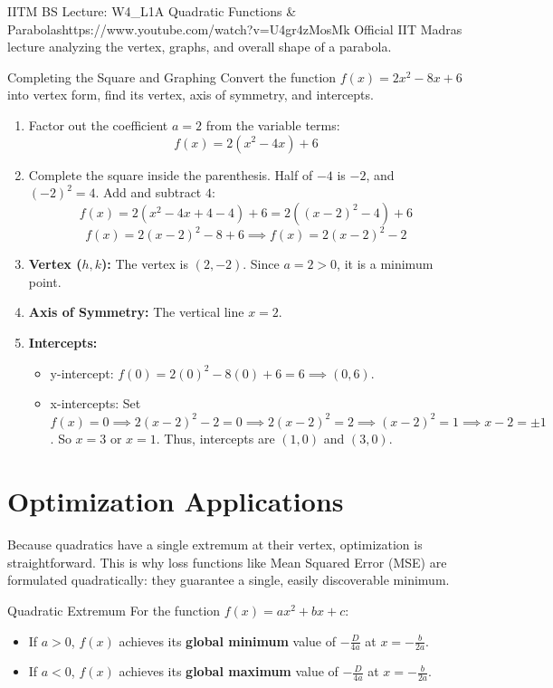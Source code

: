 \begin{videocard}{IITM BS Lecture: W4\_L1A Quadratic Functions \& Parabolas}{https://www.youtube.com/watch?v=U4gr4zMosMk}
Official IIT Madras lecture analyzing the vertex, graphs, and overall shape of a parabola.
\end{videocard}

\begin{examplebox}{Completing the Square and Graphing}
Convert the function $f(x) = 2x^2 - 8x + 6$ into vertex form, find its vertex, axis of symmetry, and intercepts.
\begin{enumerate}
    \item Factor out the coefficient $a=2$ from the variable terms:
    $$f(x) = 2(x^2 - 4x) + 6$$
    \item Complete the square inside the parenthesis. Half of $-4$ is $-2$, and $(-2)^2 = 4$. Add and subtract $4$:
    $$f(x) = 2(x^2 - 4x + 4 - 4) + 6 = 2((x-2)^2 - 4) + 6$$
    $$f(x) = 2(x-2)^2 - 8 + 6 \implies f(x) = 2(x-2)^2 - 2$$
    \item \textbf{Vertex ($h, k$):} The vertex is $(2, -2)$. Since $a = 2 > 0$, it is a minimum point.
    \item \textbf{Axis of Symmetry:} The vertical line $x = 2$.
    \item \textbf{Intercepts:}
    \begin{itemize}
        \item y-intercept: $f(0) = 2(0)^2 - 8(0) + 6 = 6 \implies (0, 6)$.
        \item x-intercepts: Set $f(x) = 0 \implies 2(x-2)^2 - 2 = 0 \implies 2(x-2)^2 = 2 \implies (x-2)^2 = 1 \implies x-2 = \pm 1$.
        So $x = 3$ or $x = 1$. Thus, intercepts are $(1, 0)$ and $(3, 0)$.
    \end{itemize}
\end{enumerate}
\end{examplebox}

\section{Optimization Applications}

Because quadratics have a single extremum at their vertex, optimization is straightforward. This is why loss functions like Mean Squared Error (MSE) are formulated quadratically: they guarantee a single, easily discoverable minimum.

\begin{theorembox}{Quadratic Extremum}
For the function $f(x) = ax^2 + bx + c$:
\begin{itemize}
    \item If $a > 0$, $f(x)$ achieves its \textbf{global minimum} value of $-\frac{D}{4a}$ at $x = -\frac{b}{2a}$.
    \item If $a < 0$, $f(x)$ achieves its \textbf{global maximum} value of $-\frac{D}{4a}$ at $x = -\frac{b}{2a}$.
\end{itemize}
\end{theorembox}

